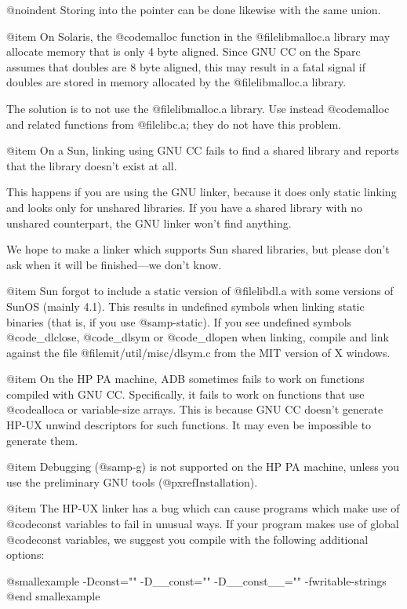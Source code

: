 @noindent
Storing into the pointer can be done likewise with the same union.

@item
On Solaris, the @code{malloc} function in the @file{libmalloc.a} library
may allocate memory that is only 4 byte aligned.  Since GNU CC on the
Sparc assumes that doubles are 8 byte aligned, this may result in a
fatal signal if doubles are stored in memory allocated by the
@file{libmalloc.a} library.

The solution is to not use the @file{libmalloc.a} library.  Use instead
@code{malloc} and related functions from @file{libc.a}; they do not have
this problem.

@item
On a Sun, linking using GNU CC fails to find a shared library and
reports that the library doesn't exist at all.

This happens if you are using the GNU linker, because it does only
static linking and looks only for unshared libraries.  If you have a
shared library with no unshared counterpart, the GNU linker won't find
anything.

We hope to make a linker which supports Sun shared libraries, but please
don't ask when it will be finished---we don't know.

@item
Sun forgot to include a static version of @file{libdl.a} with some
versions of SunOS (mainly 4.1).  This results in undefined symbols when
linking static binaries (that is, if you use @samp{-static}).  If you
see undefined symbols @code{_dlclose}, @code{_dlsym} or @code{_dlopen}
when linking, compile and link against the file
@file{mit/util/misc/dlsym.c} from the MIT version of X windows.

@item
On the HP PA machine, ADB sometimes fails to work on functions compiled
with GNU CC.  Specifically, it fails to work on functions that use
@code{alloca} or variable-size arrays.  This is because GNU CC doesn't
generate HP-UX unwind descriptors for such functions.  It may even be
impossible to generate them.

@item 
Debugging (@samp{-g}) is not supported on the HP PA machine, unless you use 
the preliminary GNU tools (@pxref{Installation}).

@item
The HP-UX linker has a bug which can cause programs which make use of
@code{const} variables to fail in unusual ways.  If your program makes
use of global @code{const} variables, we suggest you compile with the
following additional options:

@smallexample
-Dconst="" -D__const="" -D__const__="" -fwritable-strings
@end smallexample

